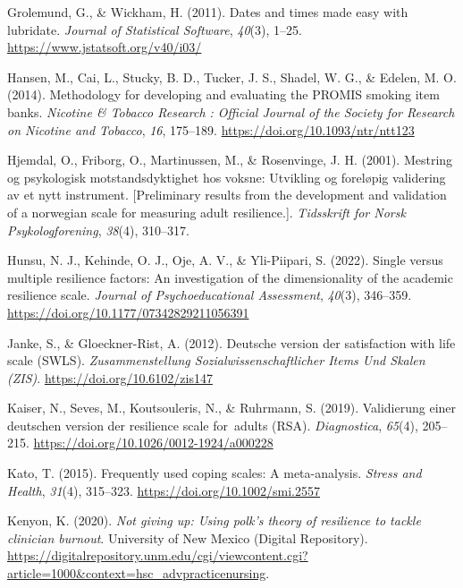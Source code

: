 \documentclass[
  man,floatsintext]{apa7}
\newlength{\cslhangindent}
\newenvironment{CSLReferences}[2] %
 {\begin{list}{}{%
  \setlength{\itemindent}{0pt}
  \setlength{\leftmargin}{0pt}
  \setlength{\parsep}{0pt}
  \ifodd #1
   \setlength{\leftmargin}{\cslhangindent}
   \setlength{\itemindent}{-1\cslhangindent}
  \fi
  \setlength{\itemsep}{#2\baselineskip}}}
 {\end{list}}
\begin{document}
\begin{CSLReferences}{1}{0}
Grolemund, G., \& Wickham, H. (2011). Dates and times made easy with {lubridate}. \emph{Journal of Statistical Software}, \emph{40}(3), 1--25. \url{https://www.jstatsoft.org/v40/i03/}

Hansen, M., Cai, L., Stucky, B. D., Tucker, J. S., Shadel, W. G., \& Edelen, M. O. (2014). Methodology for developing and evaluating the {PROMIS} smoking item banks. \emph{Nicotine \& Tobacco Research : Official Journal of the Society for Research on Nicotine and Tobacco}, \emph{16}, 175--189. \url{https://doi.org/10.1093/ntr/ntt123}

Hjemdal, O., Friborg, O., Martinussen, M., \& Rosenvinge, J. H. (2001). Mestring og psykologisk motstandsdyktighet hos voksne: Utvikling og foreløpig validering av et nytt instrument. {[}Preliminary results from the development and validation of a norwegian scale for measuring adult resilience.{]}. \emph{Tidsskrift for Norsk Psykologforening}, \emph{38}(4), 310--317.

Hunsu, N. J., Kehinde, O. J., Oje, A. V., \& Yli-Piipari, S. (2022). Single versus multiple resilience factors: An investigation of the dimensionality of the academic resilience scale. \emph{Journal of Psychoeducational Assessment}, \emph{40}(3), 346--359. \url{https://doi.org/10.1177/07342829211056391}

Janke, S., \& Gloeckner-Rist, A. (2012). Deutsche version der satisfaction with life scale (SWLS). \emph{Zusammenstellung Sozialwissenschaftlicher Items Und Skalen (ZIS)}. \url{https://doi.org/10.6102/zis147}

Kaiser, N., Seves, M., Koutsouleris, N., \& Ruhrmann, S. (2019). Validierung einer deutschen version der resilience scale for~adults (RSA). \emph{Diagnostica}, \emph{65}(4), 205--215. \url{https://doi.org/10.1026/0012-1924/a000228}

Kato, T. (2015). Frequently used coping scales: A meta-analysis. \emph{Stress and Health}, \emph{31}(4), 315--323. \url{https://doi.org/10.1002/smi.2557}

Kenyon, K. (2020). \emph{Not giving up: Using polk's theory of resilience to tackle clinician burnout}. University of New Mexico (Digital Repository). \url{https://digitalrepository.unm.edu/cgi/viewcontent.cgi?article=1000&context=hsc_advpracticenursing}.


\end{CSLReferences}
\end{document}
